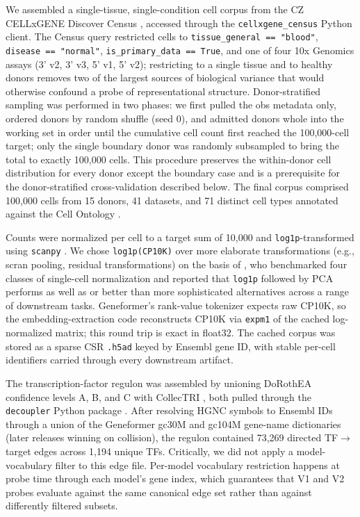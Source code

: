 \documentclass[10pt]{article}
\begin{document}
We assembled a single-tissue, single-condition cell corpus from the CZ
CELLxGENE Discover Census \citep{cellxgene2025}, accessed through the \texttt{cellxgene\_census}
Python client. The Census query restricted cells to
\texttt{tissue\_general\ ==\ "blood"}, \texttt{disease\ ==\ "normal"},
\texttt{is\_primary\_data\ ==\ True}, and one of four 10x Genomics
assays (3' v2, 3' v3, 5' v1, 5' v2); restricting to a single tissue and
to healthy donors removes two of the largest sources of biological
variance that would otherwise confound a probe of representational
structure. Donor-stratified sampling was performed in two phases: we
first pulled the obs metadata only, ordered donors by random shuffle
(seed 0), and admitted donors whole into the working set in order until
the cumulative cell count first reached the 100,000-cell target; only
the single boundary donor was randomly subsampled to bring the total to
exactly 100,000 cells. This procedure preserves the within-donor cell
distribution for every donor except the boundary case and is a
prerequisite for the donor-stratified cross-validation described below.
The final corpus comprised 100,000 cells from 15 donors, 41 datasets,
and 71 distinct cell types annotated against the Cell Ontology \citep{diehl2016cellontology}.

Counts were normalized per cell to a target sum of 10,000 and
\texttt{log1p}-transformed using \texttt{scanpy} \citep{wolf2018scanpy}. We
chose \texttt{log1p(CP10K)} over more elaborate transformations (e.g.,
scran pooling, residual transformations) on the basis of
\citet{ahlmanneltze2023normalization}, who benchmarked four classes of single-cell
normalization and reported that \texttt{log1p} followed by PCA performs
as well as or better than more sophisticated alternatives across a range
of downstream tasks. Geneformer's rank-value tokenizer expects raw
CP10K, so the embedding-extraction code reconstructs CP10K via
\texttt{expm1} of the cached log-normalized matrix; this round trip is
exact in float32. The cached corpus was stored as a sparse CSR
\texttt{.h5ad} keyed by Ensembl gene ID, with stable per-cell
identifiers carried through every downstream artifact.

The transcription-factor regulon was assembled by unioning DoRothEA
confidence levels A, B, and C \citep{garciaalonso2019dorothea} with CollecTRI \citep{mullerdott2023collectri}, both pulled through the
\texttt{decoupler} Python package \citep{badiaimompel2022decoupler}. After
resolving HGNC symbols to Ensembl IDs through a union of the Geneformer
gc30M and gc104M gene-name dictionaries (later releases winning on
collision), the regulon contained 73,269 directed TF$\to$target edges across
1,194 unique TFs. Critically, we did not apply a model-vocabulary filter
to this edge file. Per-model vocabulary restriction happens at probe
time through each model's gene index, which guarantees that V1 and V2
probes evaluate against the same canonical edge set rather than against
differently filtered subsets.
\end{document}
